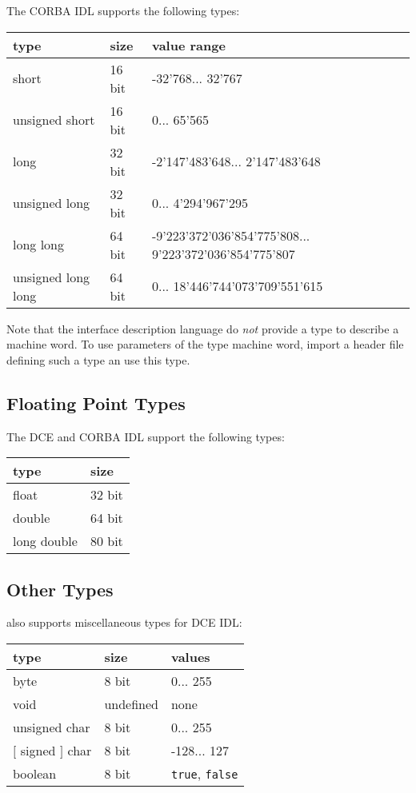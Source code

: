The CORBA IDL supports the following types:

\begin{center}
\begin{tabular}{|l|l|p{5cm}|}
\hline
type & size & value range \\ \hline
short & 16 bit & -32'768... 32'767 \\
unsigned short & 16 bit & 0... 65'565 \\
long & 32 bit & -2'147'483'648... 2'147'483'648 \\
unsigned long & 32 bit & 0... 4'294'967'295 \\
long long & 64 bit & -9'223'372'036'854'775'808... 9'223'372'036'854'775'807 \\
unsigned long long & 64 bit & 0... 18'446'744'073'709'551'615 \\
\hline
\end{tabular}
\end{center}

Note that the interface description language do \emph{not} provide
a type to describe a machine word. To use parameters of the type
machine word, import a header file defining such a type an use this
type.

\subsection{Floating Point Types}
The DCE and CORBA IDL support the following types:


\begin{center}
\begin{tabular}{|l|l|}
\hline
type & size \\ \hline
float & 32 bit \\
double & 64 bit \\
long double & 80 bit \\
\hline
\end{tabular}
\end{center}

\subsection{Other Types}

\dice{} also supports miscellaneous types for DCE IDL:

\begin{center}
\begin{tabular}{|l|l|l|}
\hline
type & size & values \\
\hline
byte & 8 bit & 0... 255 \\
void & undefined & none \\
unsigned char & 8 bit & 0... 255 \\
$[$ signed $]$ char & 8 bit & -128... 127 \\
boolean & 8 bit & {\tt true}, {\tt false} \\
\hline
\end{tabular}
\end{center}

